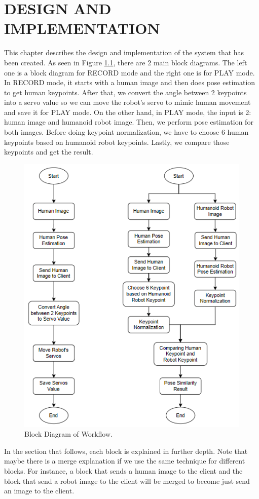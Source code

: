\chapter{DESIGN AND IMPLEMENTATION}
\label{chap:desainandimplementation}


This chapter describes the design and implementation of the system that has been created.
As seen in Figure \ref{fig:block-diagram}, there are 2 main block diagrams. The left one is a block diagram for RECORD mode and the right one is for PLAY mode.
In RECORD mode, it starts with a human image and then does pose estimation to get human keypoints. After that, we convert the angle between 2 keypoints into a servo value so we can move the robot's servo to mimic human movement and save it for PLAY mode.
On the other hand, in PLAY mode, the input is 2: human image and humanoid robot image. Then, we perform pose estimation for both images. Before doing keypoint normalization, we have to choose 6 human keypoints based on humanoid robot keypoints. Lastly, we compare those keypoints and get the result.
\begin{figure}[ht]
  \centering
  \includegraphics[scale=1.25]{gambar/diagram-block-revisi.png}
  \caption{Block Diagram of Workflow.}
  \label{fig:block-diagram}
\end{figure}
In the section that follows, each block is explained in further depth. Note that maybe there is a merge explanation if we use the same technique for different blocks. For instance, a block that sends a human image to the client and the block that send a robot image to the client will be merged to become just send an image to the client.


